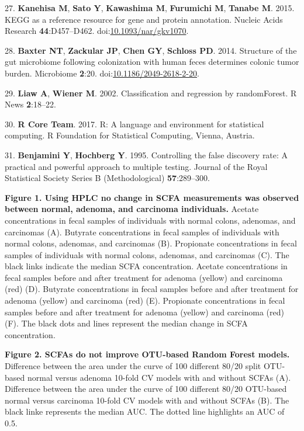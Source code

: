 \documentclass[11pt,]{article}
\begin{document}
\hypertarget{ref-Kanehisa2015}{}
27. \textbf{Kanehisa M}, \textbf{Sato Y}, \textbf{Kawashima M},
\textbf{Furumichi M}, \textbf{Tanabe M}. 2015. KEGG as a reference
resource for gene and protein annotation. Nucleic Acids Research
\textbf{44}:D457--D462.
doi:\href{https://doi.org/10.1093/nar/gkv1070}{10.1093/nar/gkv1070}.

\hypertarget{ref-scfa_baxter2014}{}
28. \textbf{Baxter NT}, \textbf{Zackular JP}, \textbf{Chen GY},
\textbf{Schloss PD}. 2014. Structure of the gut microbiome following
colonization with human feces determines colonic tumor burden.
Microbiome \textbf{2}:20.
doi:\href{https://doi.org/10.1186/2049-2618-2-20}{10.1186/2049-2618-2-20}.

\hypertarget{ref-randomforest_citation_2002}{}
29. \textbf{Liaw A}, \textbf{Wiener M}. 2002. Classification and
regression by randomForest. R News \textbf{2}:18--22.

\hypertarget{ref-r_citation_2017}{}
30. \textbf{R Core Team}. 2017. R: A language and environment for
statistical computing. R Foundation for Statistical Computing, Vienna,
Austria.

\hypertarget{ref-benjamini_controlling_1995}{}
31. \textbf{Benjamini Y}, \textbf{Hochberg Y}. 1995. Controlling the
false discovery rate: A practical and powerful approach to multiple
testing. Journal of the Royal Statistical Society Series B
(Methodological) \textbf{57}:289--300.

\newpage

\textbf{Figure 1. Using HPLC no change in SCFA measurements was observed
between normal, adenoma, and carcinoma individuals.} Acetate
concentrations in fecal samples of individuals with normal colons,
adenomas, and carcinomas (A). Butyrate concentrations in fecal samples
of individuals with normal colons, adenomas, and carcinomas (B).
Propionate concentrations in fecal samples of individuals with normal
colons, adenomas, and carcinomas (C). The black links indicate the
median SCFA concentration. Acetate concentrations in fecal samples
before and after treatment for adenoma (yellow) and carcinoma (red) (D).
Butyrate concentrations in fecal samples before and after treatment for
adenoma (yellow) and carcinoma (red) (E). Propionate concentrations in
fecal samples before and after treatment for adenoma (yellow) and
carcinoma (red) (F). The black dots and lines represent the median
change in SCFA concentration.

\textbf{Figure 2. SCFAs do not improve OTU-based Random Forest models.}
Difference between the area under the curve of 100 different 80/20 split
OTU-based normal versus adenoma 10-fold CV models with and without SCFAs
(A). Difference between the area under the curve of 100 different 80/20
OTU-based normal versus carcinoma 10-fold CV models with and without
SCFAs (B). The black linke represents the median AUC. The dotted line
highlights an AUC of 0.5.
\end{document}

